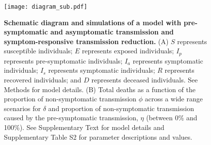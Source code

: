 \documentclass[12pt]{article}
\begin{document}
\begin{figure}[!ht]
\begin{center}
\texttt{[image: diagram\_sub.pdf]}
\caption{
\textbf{Schematic diagram and simulations of a model with pre-symptomatic and asymptomatic transmission and symptom-responsive transmission reduction.}
(A) $S$ represents susceptible individuals; $E$ represents exposed individuals; $I_p$ represents pre-symptomatic individuals; $I_a$ represents symptomatic individuals; $I_s$ represents symptomatic individuals; $R$ represents recovered individuals; and $D$ represents deceased individuals. See Methods for model details.
(B) Total deaths as a function of the proportion of non-symptomatic transmission $\phi$ across a wide range scenarios for $\delta$ and proportion of non-symptomatic transmission caused by the pre-symptomatic transmission, $\eta$ (between 0\% and 100\%). 
See Supplementary Text for model details and Supplementary Table S2 for parameter descriptions and values.
}
\end{center}
\end{figure}

\pagebreak


\end{document}
